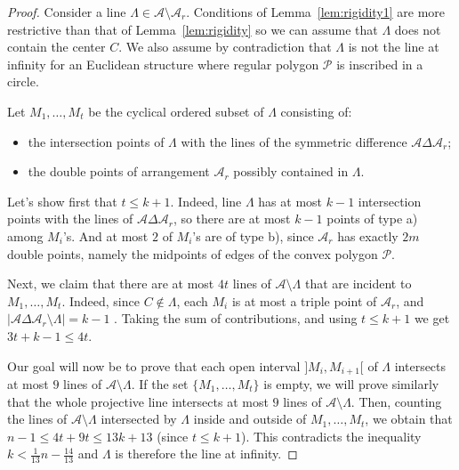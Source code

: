 \documentclass[10pt,a4paper]{amsart}
\begin{document}
\begin{proof}
Consider a line $\Lambda \in \mathcal{A} \setminus \mathcal{A}_{r}$. Conditions of Lemma~\ref{lem:rigidity1} are more restrictive than that of Lemma~\ref{lem:rigidity} so we can assume that $\Lambda$ does not contain the center $C$. We also assume by contradiction that $\Lambda$ is not the line at infinity for an Euclidean structure where regular polygon $\mathcal{P}$ is inscribed in a circle.
\par
Let $M_{1},\dots,M_{t}$ be the cyclical ordered subset of $\Lambda$ consisting of:
\begin{itemize}
    \item[a)] the intersection points of $\Lambda$ with the lines of the symmetric difference $\mathcal{A} \Delta \mathcal{A}_{r}$;
    \item[b)] the double points of arrangement $\mathcal{A}_{r}$ possibly contained in $\Lambda$.
\end{itemize}
Let's show first that $t \leq k+1$.  Indeed, line $\Lambda$ has at most $k-1$ intersection points with the lines of $\mathcal{A} \Delta \mathcal{A}_{r}$, so there are at most $k-1$ points of type a) among $M_i$'s. And at most $2$ of $M_i$'s are of type b), since  $\mathcal A_r$ has exactly $2m$ double points, namely the midpoints of edges of the convex polygon $\mathcal{P}$.

Next, we claim that there are at most $4t$ lines of ${\mathcal A}\setminus \Lambda$ that are incident to $M_1,\ldots, M_t$. Indeed, since $C\notin \Lambda$, each $M_i$ is at most a triple point of $\mathcal A_r$,  and $|\mathcal{A} \Delta \mathcal{A}_{r}\setminus \Lambda|=k-1$ . Taking the sum of contributions, and using   $t \leq k+1$ we get $3t+k-1\le 4t$.
 
\par
Our goal will now be to prove that each open interval $]M_{i},M_{i+1}[$ of $\Lambda$ intersects at most $9$ lines of $\mathcal{A}\setminus \Lambda$. If the set $\lbrace{ M_{1},\dots,M_{t} \rbrace}$ is empty, we will prove similarly that the whole projective line intersects at most $9$ lines of $\mathcal{A}\setminus \Lambda$. Then, counting the lines of $\mathcal{A}\setminus\Lambda$ intersected by $\Lambda$ inside and outside of $M_{1},\dots,M_{t}$, we obtain that $n-1 \leq 4t+9t \leq 13k+13$ (since $t \leq k+1$). This contradicts the inequality $k < \frac{1}{13}n - \frac{14}{13}$ and $\Lambda$ is therefore the line at infinity.\newline


\end{proof}
\end{document}

